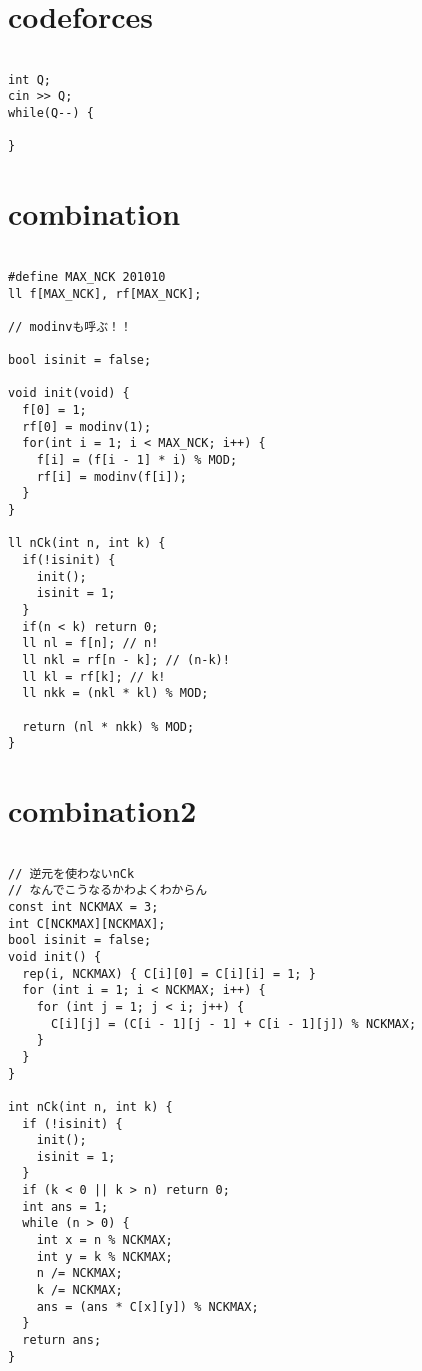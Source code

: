 \documentclass[a4j,titlepage]{jarticle} %
\begin{document}
\color{white}
\section{codeforces}
\color{black}
\begin{lstlisting}[caption=codeforces]

int Q;
cin >> Q;
while(Q--) {
  
}

\end{lstlisting}

\color{white}
\section{combination}
\color{black}
\begin{lstlisting}[caption=combination]

#define MAX_NCK 201010
ll f[MAX_NCK], rf[MAX_NCK];

// modinvも呼ぶ！！

bool isinit = false;

void init(void) {
  f[0] = 1;
  rf[0] = modinv(1);
  for(int i = 1; i < MAX_NCK; i++) {
    f[i] = (f[i - 1] * i) % MOD;
    rf[i] = modinv(f[i]);
  }
}

ll nCk(int n, int k) {
  if(!isinit) {
    init();
    isinit = 1;
  }
  if(n < k) return 0;
  ll nl = f[n]; // n!
  ll nkl = rf[n - k]; // (n-k)!
  ll kl = rf[k]; // k!
  ll nkk = (nkl * kl) % MOD;

  return (nl * nkk) % MOD;
}

\end{lstlisting}

\color{white}
\section{combination2}
\color{black}
\begin{lstlisting}[caption=combination2]

// 逆元を使わないnCk
// なんでこうなるかわよくわからん
const int NCKMAX = 3;
int C[NCKMAX][NCKMAX];
bool isinit = false;
void init() {
  rep(i, NCKMAX) { C[i][0] = C[i][i] = 1; }
  for (int i = 1; i < NCKMAX; i++) {
    for (int j = 1; j < i; j++) {
      C[i][j] = (C[i - 1][j - 1] + C[i - 1][j]) % NCKMAX;
    }
  }
}

int nCk(int n, int k) {
  if (!isinit) {
    init();
    isinit = 1;
  }
  if (k < 0 || k > n) return 0;
  int ans = 1;
  while (n > 0) {
    int x = n % NCKMAX;
    int y = k % NCKMAX;
    n /= NCKMAX;
    k /= NCKMAX;
    ans = (ans * C[x][y]) % NCKMAX;
  }
  return ans;
}

\end{lstlisting}
\end{document}

